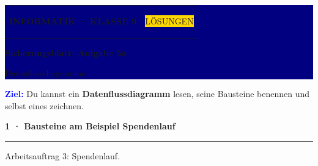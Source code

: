 \documentclass[10pt,a4paper]{article}
\newcommand{\sectiontitle}[1]{%
  \vspace{2.3mm}
  {\color{Blue}\bfseries\large #1}\par
  \vspace{0.8mm}
  {\color{Blue}\rule{\linewidth}{0.7pt}}\par
  \vspace{1.2mm}
}
\begin{document}
\colorbox{Navy}{%
  \parbox{\dimexpr\linewidth-2\fboxsep\relax}{%
    \vspace{3mm}\color{white}
    \begin{tabularx}{\linewidth}{@{}Xr@{}}
      {\small\bfseries INFORMATIK · KLASSE 9} &
      \colorbox{Gold}{\color{Navy}\small\bfseries\strut LÖSUNGEN}
    \end{tabularx}
    \vspace{2.5mm}

    {\fontsize{22}{25}\selectfont\bfseries Sicherungsblatt: Aufgabe 5a}\par
    \vspace{1mm}
    {\large Datenflussdiagramme}
    \vspace{3mm}
  }%
}

\vspace{3mm}
\colorbox{Sky}{%
  \parbox{\dimexpr\linewidth-2\fboxsep\relax}{%
    \vspace{1.8mm}
    \textcolor{Blue}{\bfseries Ziel:}
    Du kannst ein \textbf{Datenflussdiagramm} lesen, seine Bausteine benennen
    und selbst eines zeichnen.
    \vspace{1.8mm}
  }%
}

\sectiontitle{1 · Bausteine am Beispiel Spendenlauf}

{\small Arbeitsauftrag 3: Spendenlauf.\par}
\end{document}
